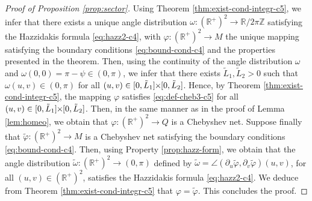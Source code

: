 \documentclass{article}
\newcommand{\PLH}{{\mkern-1mu\times\mkern-1mu}}
\newcommand{\Times}{\PLH}
\newcommand{\R}{\mathbb{R}}
\newcommand{\Z}{\mathbb{Z}}
\newcommand{\surf}{M}
\newcommand{\DU}{\partial_{u}}
\newcommand{\DV}{\partial_{v}}
\newcommand{\sect}{Q}
\theoremstyle{remark}
\theoremstyle{prpart}
\begin{document}
\begin{proof}[Proof of Proposition \ref{prop:sector}]
  Using Theorem \ref{thm:exist-cond-integr-c5}, we infer that there exists a unique angle distribution $\omega:(\R^+)^2\to\R/2\pi\Z$ satisfying the Hazzidakis formula \eqref{eq:hazz2-c4}, with $\varphi:(\R^+)^2\to\surf$ the unique mapping satisfying the boundary conditions \eqref{eq:bound-cond-c4} and the properties presented in the theorem.
Then, using the continuity of the angle distribution $\omega$ and $\omega(0,0)=\pi-\psi\in(0,\pi)$, we infer that there exists $\tilde L_1,\tilde L_2>0$ such that $\omega(u,v)\in(0,\pi)$ for all $(u,v)\in[0,\tilde L_1]\Times[0,\tilde L_2]$. Hence, by Theorem \ref{thm:exist-cond-integr-c5}, the mapping $\varphi$ satisfies \eqref{eq:def-cheb3-c5} for all $(u,v)\in[0,\tilde L_1]\Times[0,\tilde L_2]$. Then, in the same manner as in the proof of Lemma \ref{lem:homeo}, we obtain that $\varphi:(\R^+)^2\to\sect$ is a Chebyshev net. Suppose finally that $\tilde\varphi:(\R^+)^2\to\surf$ is a Chebyshev net satisfying the boundary conditions \eqref{eq:bound-cond-c4}. Then, using Property \ref{prop:hazz-form}, we obtain that the angle distribution $\tilde\omega:(\R^+)^2\to(0,\pi)$ defined by $\tilde\omega=\angle(\DU\tilde\varphi,\DV\tilde\varphi)(u,v)$, for all $(u,v)\in(\R^+)^2$, satisfies the Hazzidakis formula \eqref{eq:hazz2-c4}. We deduce from Theorem \ref{thm:exist-cond-integr-c5} that $\varphi=\tilde\varphi$. This concludes the proof.
\end{proof}

\end{document}
